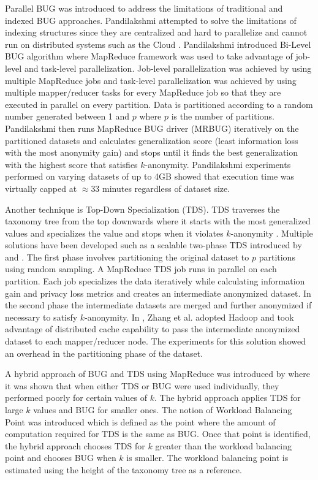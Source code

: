 \documentclass[11pt]{article}       %
\begin{document}
Parallel BUG was introduced to address the limitations of traditional and indexed BUG approaches. Pandilakshmi attempted to solve the limitations of indexing structures since they are centralized and hard to parallelize and cannot run on distributed systems such as the Cloud \cite{Pandilakshmi:2014}. Pandilakshmi introduced Bi-Level BUG algorithm where MapReduce framework was used to take advantage of job-level and task-level parallelization. Job-level parallelization was achieved by using multiple MapReduce jobs and task-level parallelization was achieved by using multiple mapper/reducer tasks for every MapReduce job so that they are executed in parallel on every partition. Data is partitioned according to a random number generated between 1 and $p$ where $p$ is the number of partitions. Pandilakshmi then runs MapReduce BUG driver (MRBUG) iteratively on the partitioned datasets and calculates generalization score (least information loss with the most anonymity gain) and stops until it finds the best generalization with the highest score that satisfies $k$-anonymity. Pandilakshmi experiments performed on varying datasets of up to 4GB showed that execution time was virtually capped at $\approx$33 minutes regardless of dataset size.

Another technique is Top-Down Specialization (TDS). TDS traverses the taxonomy tree from the top downwards where it starts with the most generalized values and specializes the value and stops when it violates $k$-anonymity \cite{Fung:2005}. Multiple solutions have been developed such as a scalable two-phase TDS introduced by \cite{Priyanka:2014} and \cite{Zhang:2014}. The first phase involves partitioning the original dataset to $p$ partitions using random sampling. A MapReduce TDS job runs in parallel on each partition. Each job specializes the data iteratively while calculating information gain and privacy loss metrics and creates an intermediate anonymized dataset. In the second phase the intermediate datasets are merged and further anonymized if necessary to satisfy $k$-anonymity. In \cite{Zhang:2014}, Zhang et al. adopted Hadoop\textsuperscript{\textregistered} and took advantage of distributed cache capability to pass the intermediate anonymized dataset to each mapper/reducer node. The experiments for this solution showed an overhead in the partitioning phase of the dataset.

A hybrid approach of BUG and TDS using MapReduce was introduced by \cite{Zhang:2013} where it was shown that when either TDS or BUG were used individually, they performed poorly for certain values of $k$. The hybrid approach applies TDS for large $k$ values and BUG for smaller ones. The notion of Workload Balancing Point was introduced which is defined as the point where the amount of computation required for TDS is the same as BUG. Once that point is identified, the hybrid approach chooses TDS for $k$ greater than the workload balancing point and chooses BUG when $k$ is smaller. The workload balancing point is estimated using the height of the taxonomy tree as a reference.
\end{document}
